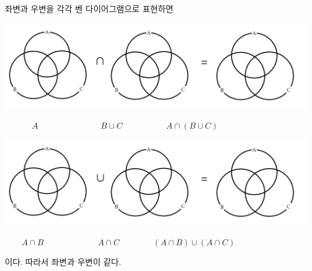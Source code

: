 \documentclass{oblivoir}
\begin{document}
\begin{enumerate}
\begin{mdframed}
좌변과 우변을 각각 벤 다이어그램으로 표현하면
\par
\includegraphics[width=.9\textwidth]{three_set_rule_cap}
\par\vspace{-10pt}
\(\qquad\quad\:A\qquad\qquad\qquad\quad\:\:B\cup C
\qquad\qquad\quad\:A\cap(B\cup C)\)
\par
\includegraphics[width=.9\textwidth]{three_set_rule_cup}
\par\vspace{-10pt}
\(\qquad A\cap B\qquad\qquad\qquad\:\:A\cap C
\qquad\qquad(A\cap B)\cup(A\cap C)\)
\par
이다.
따라서 좌변과 우변이 같다.
\end{mdframed}
\end{enumerate}
\end{document}
